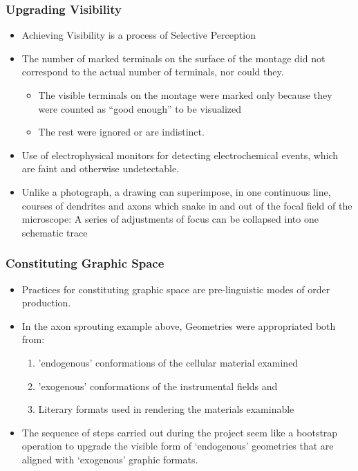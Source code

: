 \documentclass[a4paper]{article}
\begin{document}
\subsubsection{Upgrading Visibility}
\begin{itemize}
	\item Achieving Visibility is a process of Selective Perception
	\item The number of marked terminals on the surface of the montage did not correspond to the actual number of terminals, nor could they.
	\begin{itemize}
		\item The visible terminals on the montage were marked only because they were counted as “good enough” to be visualized
		\item The rest were ignored or are indistinct.
	\end{itemize}
	\item Use of electrophysical monitors for detecting electrochemical events, which are faint and otherwise undetectable.
	\item Unlike a photograph, a drawing can superimpose, in one continuous line, courses of dendrites and axons which snake in and out of the focal field of the microscope: A series of adjustments of focus can be collapsed into one schematic trace
\end{itemize}

\subsubsection{Constituting Graphic Space}
\begin{itemize}
	\item Practices for constituting graphic space are pre-linguistic modes of order production.
	\item In the axon sprouting example above, Geometries were appropriated both from: 
	\begin{enumerate}
		\item 'endogenous' conformations of the cellular material examined 
		\item 'exogenous' conformations of the instrumental fields and
		\item Literary formats used in rendering the materials examinable
	\end{enumerate}
	\item The sequence of steps carried out during the project seem like a bootstrap operation to upgrade the visible form of ‘endogenous’ geometries that are aligned with ‘exogenous’ graphic formats.
\end{itemize}
\end{document}
